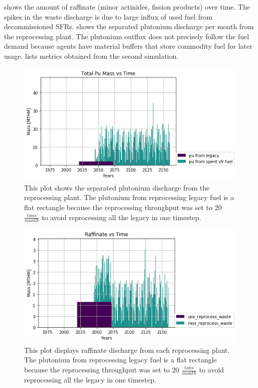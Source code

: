  shows the amount of raffinate
(minor actinides, fission products) over time. The spikes in the 
waste discharge is due to large influx of used fuel from
decommissioned \glspl{SFR}.  shows the separated plutonium discharge
per month from the reprocessing plant. The plutonium outflux
does not precisely follow the fuel demand because \Cyclus agents have
material buffers that store commodity fuel for later usage. 
 lists metrics obtained from the second simulation.

\begin{figure}[htbp!]
	\begin{center}
		\includegraphics[scale=0.7]{./images/french-transition/pu.png}
	\end{center}
	\caption{This plot shows the separated plutonium discharge from the reprocessing plant.
			 The plutonium from reprocessing legacy fuel is a flat rectangle because the 
			 reprocessing throughput was set to 20 $\frac{tons}{month}$ to avoid reprocessing
			 all the legacy in one timestep.}
	\label{fig:pu_no_cum}
\end{figure}


\begin{figure}[htbp!]
	\begin{center}
		\includegraphics[scale=0.7]{./images/french-transition/reprocess_waste.png}
	\end{center}
	\caption{This plot displays raffinate discharge from each reprocessing plant.
			The plutonium from reprocessing legacy fuel is a flat rectangle because the 
			reprocessing throughput was set to 20 $\frac{tons}{month}$ to avoid reprocessing
			all the legacy in one timestep.}
	\label{fig:reprocess_waste}
\end{figure}


